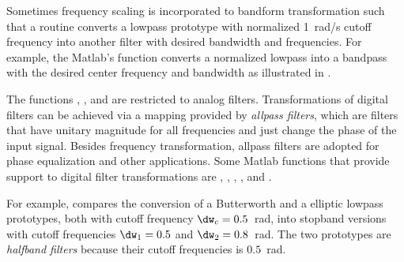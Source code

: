 Sometimes frequency scaling is incorporated to bandform transformation such that a routine converts a lowpass prototype with normalized 1~rad/s cutoff frequency into another filter with desired bandwidth and frequencies. For example, the Matlab's function  converts a normalized lowpass into a bandpass with the desired center frequency and bandwidth as illustrated in .

The functions , ,  and  are restricted to analog filters. Transformations of digital filters can be achieved via a mapping provided by \emph{allpass filters}, which are filters that have unitary magnitude for all frequencies and just change the phase of the input signal. Besides frequency transformation, allpass filters are adopted for phase equalization and other applications. Some Matlab functions that provide support to digital filter transformations are , , , ,  and .

For example,  compares the conversion of a Butterworth and a elliptic lowpass prototypes, both with cutoff frequency $\dw_c=0.5$~rad, into stopband versions with cutoff frequencies $\dw_1=0.5$ and $\dw_2=0.8$~rad. The two prototypes are \emph{halfband filters} because their cutoff frequencies is $0.5$~rad.


